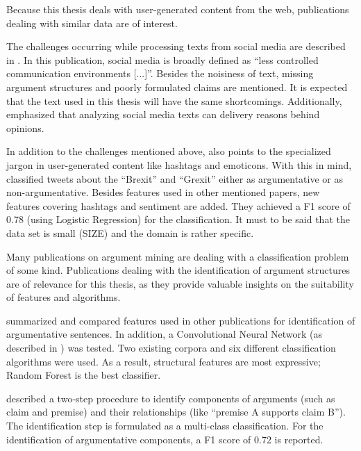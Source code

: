 Because this thesis deals with user-generated content from the web, publications dealing with similar data are of interest.

The challenges occurring while processing texts from social media are described in \cite{Snajder2017Social-Media-Ar}.  In this publication, social media is broadly defined as \enquote{less controlled communication environments [...]}. Besides the noisiness of text, missing argument structures and poorly formulated claims are mentioned. It is expected that the text used in this thesis will have the same shortcomings. Additionally, \cite{Snajder2017Social-Media-Ar} emphasized that analyzing social media texts can delivery reasons behind opinions. 

In addition to the challenges mentioned above, \cite{Dusmanu2017Argument-Mining} also points to the specialized jargon in user-generated content like hashtags and emoticons. With this in mind, \cite{Dusmanu2017Argument-Mining} classified tweets about the \enquote{Brexit} and \enquote{Grexit} either as argumentative or as non-argumentative. Besides features used in other mentioned papers, new features covering hashtags and sentiment are added. They achieved a F1 score of 0.78 (using Logistic Regression) for the classification. It must to be said that the data set is small (SIZE) and the domain is rather specific.\newline

Many publications on argument mining are dealing with a classification problem of some kind. Publications dealing with the identification of argument structures are of relevance for this thesis, as they provide valuable insights on the suitability of features and algorithms.

\cite{Aker2017What-works-and-} summarized and compared features used in other publications for identification of argumentative sentences. In addition, a Convolutional Neural Network (as described in \cite{Kim2014Convolutional-N}) was tested. Two existing corpora and six different classification algorithms were used. As a result, structural features are most expressive; Random Forest is the best classifier.

\cite{Stab2014Identifying-Arg} described a two-step procedure to identify components of arguments (such as claim and premise) and their relationships (like \enquote{premise A supports claim B}). The identification step is formulated as a multi-class classification. For the identification of argumentative components, a F1 score of 0.72 is reported.

